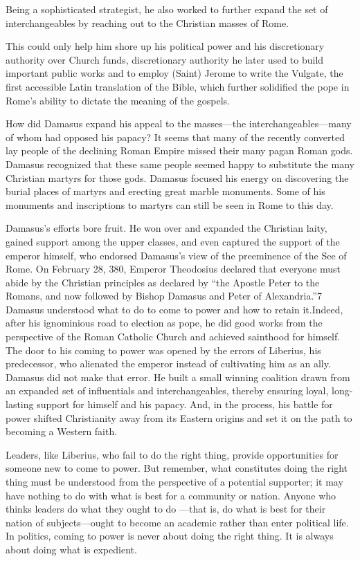 \documentclass[10pt]{article}
\begin{document}
{\large Being a sophisticated strategist, he also worked to further expand the
set of interchangeables by reaching out to the Christian masses of Rome.}

{\large This could only help him shore up his political power and his
discretionary authority over Church funds, discretionary authority he later used
to build important public works and to employ (Saint) Jerome to write the
Vulgate, the first accessible Latin translation of the Bible, which further
solidified the pope in Rome's ability to dictate the meaning of the gospels.}

{\large How did Damasus expand his appeal to the masses---the
interchangeables---many of whom had opposed his papacy? It seems that many of the
recently converted lay people of the declining Roman Empire missed their many
pagan Roman gods. Damasus recognized that these same people seemed happy to
substitute the many Christian martyrs for those gods. Damasus focused his energy
on discovering the burial places of martyrs and erecting great marble monuments.
Some of his monuments and inscriptions to martyrs can still be seen in Rome to
this day.}

{\large Damasus's efforts bore fruit. He won over and expanded the Christian
laity, gained support among the upper classes, and even captured the support of
the emperor himself, who endorsed Damasus's view of the preeminence of the See of
Rome. On February 28, 380, Emperor Theodosius declared that everyone must abide
by the Christian principles as declared by ``the Apostle Peter to the Romans, and
now followed by Bishop Damasus and Peter of Alexandria.''7 Damasus understood
what to do to come to power and how to retain it.Indeed, after his ignominious
road to election as pope, he did good works from the perspective of the Roman
Catholic Church and achieved sainthood for himself. The door to his coming to
power was opened by the errors of Liberius, his predecessor, who alienated the
emperor instead of cultivating him as an ally. Damasus did not make that error.
He built a small winning coalition drawn from an expanded set of influentials and
interchangeables, thereby ensuring loyal, long-lasting support for himself and
his papacy. And, in the process, his battle for power shifted Christianity away
from its Eastern origins and set it on the path to becoming a Western faith.}

{\large Leaders, like Liberius, who fail to do the right thing, provide
opportunities for someone new to come to power. But remember, what constitutes
doing the right thing must be understood from the perspective of a potential
supporter; it may have nothing to do with what is best for a community or nation.
Anyone who thinks leaders do what they ought to do ---that is, do what is best
for their nation of subjects---ought to become an academic rather than enter
political life. In politics, coming to power is never about doing the right
thing. It is always about doing what is expedient.}
\end{document}
